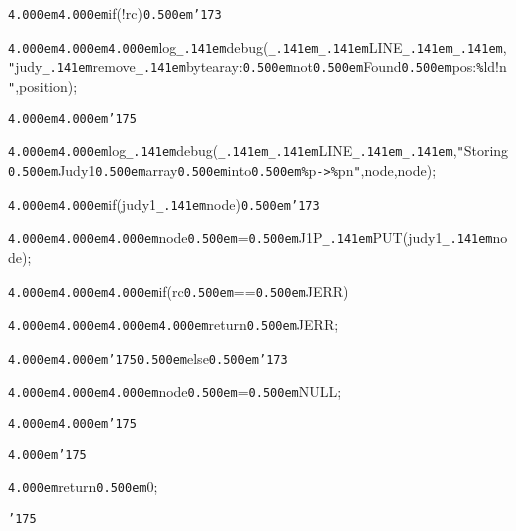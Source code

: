 \noindent
{}{\tt\mc \kern4.000em}{\tt\mc \kern4.000em}if(!rc){\tt\mc \kern0.500em}{\tt\char'173}

\noindent
{}{\tt\mc \kern4.000em}{\tt\mc \kern4.000em}{\tt\mc \kern4.000em}log{\tt\_\kern.141em}debug({\tt\_\kern.141em}{\tt\_\kern.141em}LINE{\tt\_\kern.141em}{\tt\_\kern.141em},{\tt "}judy{\tt\_\kern.141em}remove{\tt\_\kern.141em}bytearay:{\tt\mc \kern0.500em}not{\tt\mc \kern0.500em}Found{\tt\mc \kern0.500em}pos:{\tt\%}ld!{\tt{}}n{\tt "},position);

\noindent
{}{\tt\mc \kern4.000em}{\tt\mc \kern4.000em}{\tt\char'175}

\noindent
{}\hfill

\noindent
{}{\tt\mc \kern4.000em}{\tt\mc \kern4.000em}log{\tt\_\kern.141em}debug({\tt\_\kern.141em}{\tt\_\kern.141em}LINE{\tt\_\kern.141em}{\tt\_\kern.141em},{\tt "}Storing{\tt\mc \kern0.500em}Judy1{\tt\mc \kern0.500em}array{\tt\mc \kern0.500em}into{\tt\mc \kern0.500em}{\tt\%}p{\tt -}{\tt >}{\tt\%}p{\tt{}}n{\tt "},node,{\tt *}node);

\noindent
{}\hfill

\noindent
{}{\tt\mc \kern4.000em}{\tt\mc \kern4.000em}if(judy1{\tt\_\kern.141em}node){\tt\mc \kern0.500em}{\tt\char'173}

\noindent
{}{\tt\mc \kern4.000em}{\tt\mc \kern4.000em}{\tt\mc \kern4.000em}{\tt *}node{\tt\mc \kern0.500em}={\tt\mc \kern0.500em}J1P{\tt\_\kern.141em}PUT(judy1{\tt\_\kern.141em}node);

\noindent
{}{\tt\mc \kern4.000em}{\tt\mc \kern4.000em}{\tt\mc \kern4.000em}if(rc{\tt\mc \kern0.500em}=={\tt\mc \kern0.500em}JERR)

\noindent
{}{\tt\mc \kern4.000em}{\tt\mc \kern4.000em}{\tt\mc \kern4.000em}{\tt\mc \kern4.000em}return{\tt\mc \kern0.500em}JERR;

\noindent
{}{\tt\mc \kern4.000em}{\tt\mc \kern4.000em}{\tt\char'175}{\tt\mc \kern0.500em}else{\tt\mc \kern0.500em}{\tt\char'173}

\noindent
{}{\tt\mc \kern4.000em}{\tt\mc \kern4.000em}{\tt\mc \kern4.000em}{\tt *}node{\tt\mc \kern0.500em}={\tt\mc \kern0.500em}NULL;

\noindent
{}{\tt\mc \kern4.000em}{\tt\mc \kern4.000em}{\tt\char'175}

\noindent
{}{\tt\mc \kern4.000em}{\tt\char'175}

\noindent
{}{\tt\mc \kern4.000em}return{\tt\mc \kern0.500em}0;

\noindent
{}{\tt\char'175}

\noindent
{}\hfill

